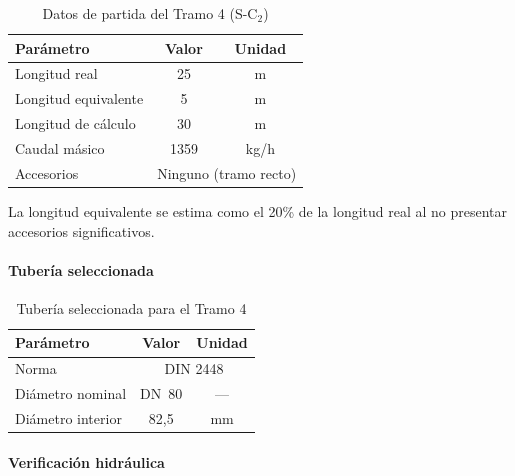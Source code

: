 \begin{table}[H]
	\centering
	\caption{Datos de partida del Tramo 4 (S-C$_2$)}
	\label{tab:datos-tramo4}
	\begin{tabular}{lcc}
		\toprule
		\textbf{Parámetro}   & \textbf{Valor}                            & \textbf{Unidad} \\
		\midrule
		Longitud real        & 25                                        & m               \\
		Longitud equivalente & 5                                         & m               \\
		Longitud de cálculo  & 30                                        & m               \\
		Caudal másico        & 1359                                      & kg/h            \\
		Accesorios           & \multicolumn{2}{c}{Ninguno (tramo recto)}                   \\
		\bottomrule
	\end{tabular}
\end{table}

La longitud equivalente se estima como el 20\% de la longitud real al no presentar accesorios significativos.

\paragraph{Tubería seleccionada}

\begin{table}[H]
	\centering
	\caption{Tubería seleccionada para el Tramo 4}
	\label{tab:tuberia-tramo4}
	\begin{tabular}{lcc}
		\toprule
		\textbf{Parámetro} & \textbf{Valor}               & \textbf{Unidad} \\
		\midrule
		Norma              & \multicolumn{2}{c}{DIN 2448}                   \\
		Diámetro nominal   & DN~80                        & ---             \\
		Diámetro interior  & 82{,}5                       & mm              \\
		\bottomrule
	\end{tabular}
\end{table}

\paragraph{Verificación hidráulica}

